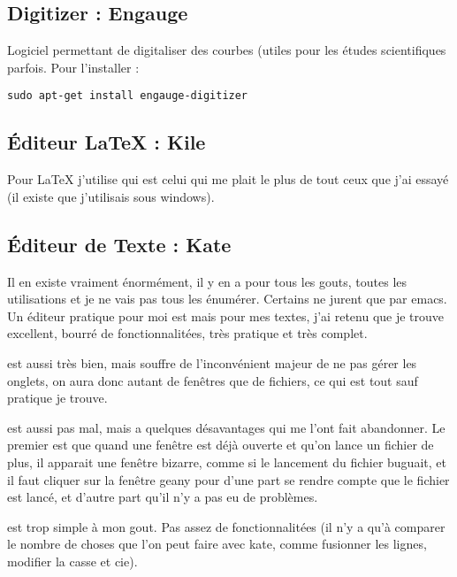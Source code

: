 \documentclass[a4paper,twoside]{article}
\begin{document}
\subsection{Digitizer : Engauge}
Logiciel permettant de digitaliser des courbes (utiles pour les études scientifiques parfois. Pour l'installer :
\begin{verbatim}
sudo apt-get install engauge-digitizer
\end{verbatim}


\subsection{\'Editeur \LaTeX{} : Kile}
Pour \LaTeX{} j'utilise  qui est celui qui me plait le plus de tout ceux que j'ai essayé (il existe  que j'utilisais sous windows).

\subsection{\'Editeur de Texte : Kate}
Il en existe vraiment énormément, il y en a pour tous les gouts, toutes les utilisations et je ne vais pas tous les énumérer. Certains ne jurent que par emacs. Un éditeur pratique pour moi est  mais pour mes textes, j'ai retenu  que je trouve excellent, bourré de fonctionnalitées, très pratique et très complet.

 est aussi très bien, mais souffre de l'inconvénient majeur de ne pas gérer les onglets, on aura donc autant de fenêtres que de fichiers, ce qui est tout sauf pratique je trouve.

 est aussi pas mal, mais a quelques désavantages qui me l'ont fait abandonner. Le premier est que quand une fenêtre est déjà ouverte et qu'on lance un fichier de plus, il apparait une fenêtre bizarre, comme si le lancement du fichier buguait, et il faut cliquer sur la fenêtre geany pour d'une part se rendre compte que le fichier est lancé, et d'autre part qu'il n'y a pas eu de problèmes.

 est trop simple à mon gout. Pas assez de fonctionnalitées (il n'y a qu'à comparer le nombre de choses que l'on peut faire avec kate, comme fusionner les lignes, modifier la casse et cie).

\end{document}
